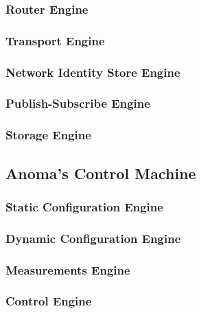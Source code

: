 \subsubsection{Router Engine}

\subsubsection{Transport Engine}

\subsubsection{Network Identity Store Engine}

\subsubsection{Publish-Subscribe Engine}

\subsubsection{Storage Engine}

\subsection{Anoma's Control Machine}

\subsubsection{Static Configuration Engine}

\subsubsection{Dynamic Configuration Engine}

\subsubsection{Measurements Engine}


\subsubsection{Control Engine}




